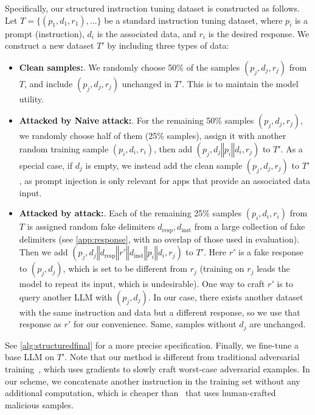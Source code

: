 Specifically, our structured instruction tuning dataset is constructed as follows.
Let $T=\{(p_1,d_1,r_1),\dots\}$ be a standard instruction tuning dataset, where $p_i$ is a prompt (instruction), $d_i$ is the associated data, and $r_i$ is the desired response.
We construct a new dataset $T'$ by including three types of data:
\begin{itemize}
\item \textbf{Clean samples:}. We randomly choose 50\% of the samples $(p_j,d_j,r_j)$ from $T$, and include $(p_j,d_j,r_j)$ unchanged in $T'$. This is to maintain the model utility.
\item \textbf{Attacked by Naive attack:}. For the remaining 50\% samples $(p_j,d_j,r_j)$, we randomly choose half of them (25\% samples), assign it with another random training sample $(p_i,d_i,r_i)$, then add $(p_j,d_j \mathbin\Vert p_i \mathbin\Vert d_i,r_j)$ to $T'$. As a special case, if $d_j$ is empty, we instead add the clean sample $(p_j,d_j,r_j)$ to $T'$, as prompt injection is only relevant for apps that provide an associated data input.
\item \textbf{Attacked by \completionuser attack:}. Each of the remaining 25\% samples $(p_i,d_i,r_i)$ from $T$ is assigned random fake delimiters $d_\text{resp},d_\text{inst}$ from a large collection of fake delimiters (see \cref{app:response}, with no overlap of those used in evaluation). Then we add $(p_j,d_j \mathbin\Vert d_\text{resp} \mathbin\Vert r' \mathbin\Vert d_\text{inst} \mathbin\Vert p_i \mathbin\Vert d_i,r_j)$ to $T'$. Here $r'$ is a fake response to $(p_j,d_j)$, which is set to be different from $r_j$ (training on $r_j$ leads the model to repeat its input, which is undesirable). One way to craft $r'$ is to query another LLM with $(p_j,d_j)$. 
In our case, there exists another dataset with the same instruction and data but a different response, so we use that response as $r'$ for our convenience. 
Same, samples without $d_j$ are unchanged.
\end{itemize}
See \cref{alg:structuredfinal} for a more precise specification.
Finally, we fine-tune a base LLM on $T'$.
Note that our method is different from traditional adversarial training~\citep{madry2018towards}, which uses gradients to slowly craft worst-case adversarial examples.
In our scheme, we concatenate another instruction in the training set without any additional computation, which is cheaper than~\citet{yi2023benchmarking} that uses human-crafted malicious samples.


